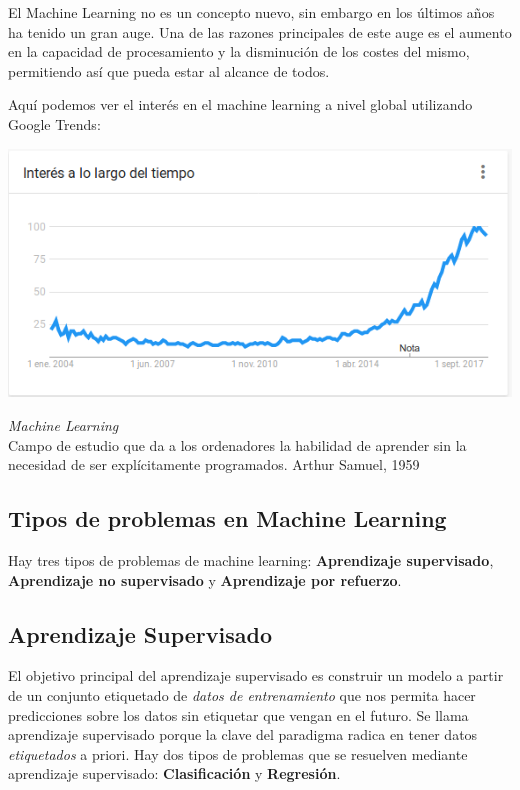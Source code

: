 El Machine Learning no es un concepto nuevo, sin embargo en los últimos años ha tenido un gran auge. Una de las  razones principales de este auge es  el  aumento  en  la  capacidad  de  procesamiento  y  la  disminución  de  los  costes  del mismo, permitiendo así que pueda estar al alcance de todos.

Aquí podemos ver el interés en el machine learning a nivel global utilizando Google Trends:
\begin{center}
\includegraphics[scale=0.7]{./img/ml_google_trends.png} 
\end{center}

\begin{definicion}
\emph{Machine Learning}\\
Campo  de  estudio  que  da  a  los  ordenadores  la  habilidad  de  aprender  sin  la  
necesidad de ser explícitamente programados. 
Arthur Samuel, 1959
\end{definicion}

\pagebreak
\subsection{Tipos de problemas en Machine Learning}
Hay tres tipos de problemas de machine learning: \textbf{Aprendizaje supervisado}, \textbf{Aprendizaje no supervisado} y \textbf{Aprendizaje por refuerzo}.  

\subsection{Aprendizaje Supervisado}
El objetivo principal del aprendizaje supervisado es construir un modelo a partir de un conjunto etiquetado de \textit{datos de entrenamiento} que nos permita hacer predicciones sobre los datos sin etiquetar que vengan en el futuro.  
Se llama aprendizaje supervisado porque la clave del paradigma radica en tener datos \textit{etiquetados} a priori.  
Hay dos tipos de problemas que se resuelven mediante aprendizaje supervisado:  
\textbf{Clasificación} y \textbf{Regresión}.

